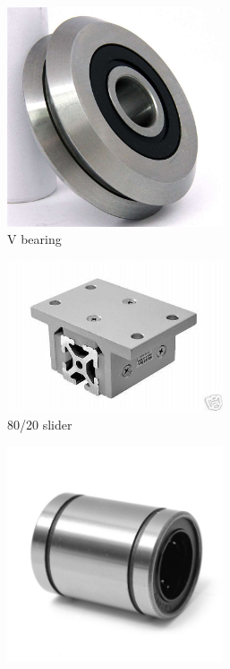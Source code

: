 \documentclass[10pt,letterpaper]{book}
\begin{document}
	\begin{figure}[H]
		\begin{subfigure}[b]{.32\linewidth}
			\includegraphics[width=0.7\textwidth]{imgs/vbearing.jpeg}
			\caption{V bearing}
		\end{subfigure}
		\begin{subfigure}[b]{.32\linewidth}
			\includegraphics[width=0.7\textwidth]{imgs/8020slider.jpeg}
			\caption{80/20 slider}
		\end{subfigure}
		\begin{subfigure}[b]{.32\linewidth}
			\includegraphics[width=0.7\textwidth]{imgs/linearbearing.jpeg}

\end{subfigure}
\end{figure}
\end{document}
